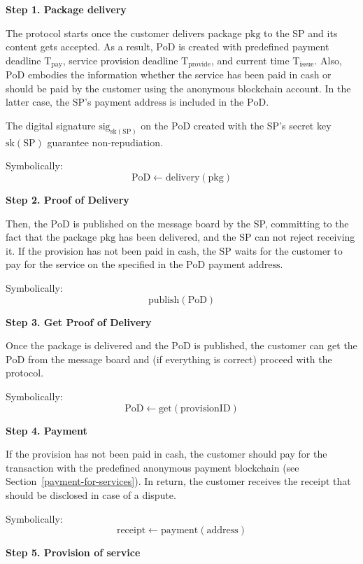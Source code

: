 \documentclass[pdftex,twocolumn,epjc3]{svjour3}
\begin{document}
{\noindent \textbf
{Step 1. Package delivery}\label{step-1-package-delivery}

The protocol starts once the customer delivers package $\mathrm{pkg}$ to the SP and its content gets accepted. As a result, $\mathrm{PoD}$ is created with predefined payment deadline $\mathrm{T}_\mathrm{pay}$, service provision deadline $\mathrm{T}_\mathrm{provide}$, and current time $\mathrm{T}_\mathrm{issue}$. Also, $\mathrm{PoD}$ embodies the information whether the service has been paid in cash or should be paid by the customer using the anonymous blockchain account. In the latter case, the SP's payment $\mathrm{address}$ is included in the $\mathrm{PoD}$.

The digital signature $\mathrm{sig}_{\mathrm{sk}(\mathrm{SP})}$ on the $\mathrm{PoD}$ created with the SP's secret key $\mathrm{sk}(\mathrm{SP})$ guarantee non-repudiation.

Symbolically: 
\[
\mathrm{PoD \gets delivery(pkg)}
\]

\noindent \textbf
{Step 2. Proof of Delivery}\label{step-2-pod}

Then, the $\mathrm{PoD}$ is published on the message board by the SP, committing to the fact that the package $\mathrm{pkg}$ has been delivered, and the SP can not reject receiving it. If the provision has not been paid in cash, the SP waits for the customer to pay for the service on the specified in the $\mathrm{PoD}$ payment $\mathrm{address}$.

Symbolically: 
\[
\mathrm{publish(PoD)}
\]

\noindent \textbf
{Step 3. Get Proof of Delivery}\label{step-3-get-pod}

Once the package is delivered and the $\mathrm{PoD}$ is published, the customer can get the $\mathrm{PoD}$ from the message board and (if everything is correct) proceed with the protocol.

Symbolically: 
\[
\mathrm{PoD \gets get(provisionID)}
\]

\noindent \textbf
{Step 4. Payment}\label{step-4-payment}

If the provision has not been paid in cash, the customer should pay for the transaction with the predefined anonymous payment blockchain (see Section~\ref{payment-for-services}).
In return, the customer receives the $\mathrm{receipt}$ that should be disclosed in case of a dispute.

Symbolically: 
\[
\mathrm{receipt \gets payment(address)}
\]

\noindent \textbf
{Step 5. Provision of service}\label{step-5-provision-of-service} 

}
\end{document}
